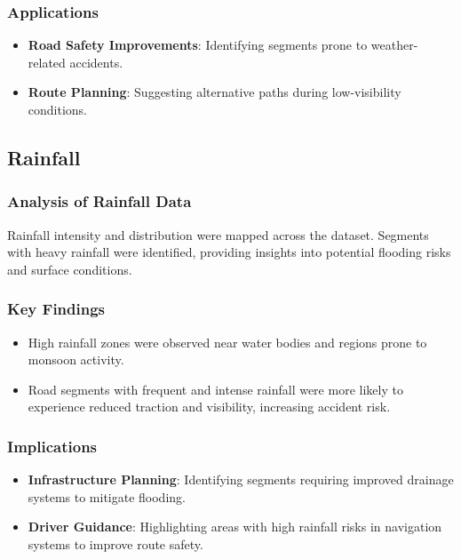 \subsubsection{Applications}
\begin{itemize}
    \item \textbf{Road Safety Improvements}: Identifying segments prone to weather-related accidents.
    \item \textbf{Route Planning}: Suggesting alternative paths during low-visibility conditions.
\end{itemize}

\subsection{Rainfall}
\subsubsection{Analysis of Rainfall Data}
Rainfall intensity and distribution were mapped across the dataset. Segments with heavy rainfall were identified, providing insights into potential flooding risks and surface conditions.

\subsubsection{Key Findings}
\begin{itemize}
    \item High rainfall zones were observed near water bodies and regions prone to monsoon activity.
    \item Road segments with frequent and intense rainfall were more likely to experience reduced traction and visibility, increasing accident risk.
\end{itemize}

\subsubsection{Implications}
\begin{itemize}
    \item \textbf{Infrastructure Planning}: Identifying segments requiring improved drainage systems to mitigate flooding.
    \item \textbf{Driver Guidance}: Highlighting areas with high rainfall risks in navigation systems to improve route safety.
\end{itemize}
